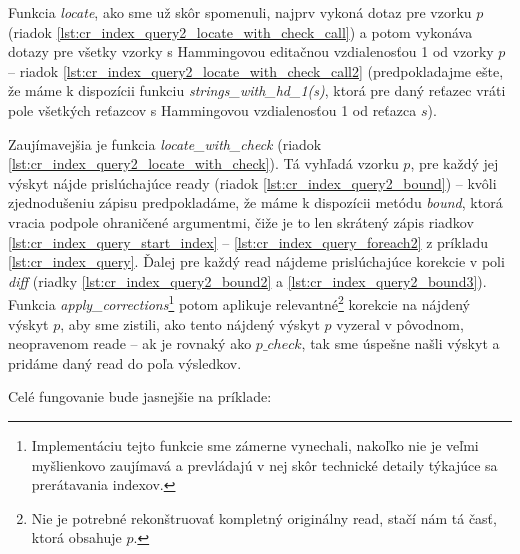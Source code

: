 Funkcia \emph{locate}, ako sme už skôr spomenuli, najprv vykoná dotaz pre vzorku $p$ (riadok \ref{lst:cr_index_query2_locate_with_check_call}) a potom vykonáva dotazy pre všetky vzorky s Hammingovou editačnou vzdialenosťou 1 od vzorky $p$ -- riadok \ref{lst:cr_index_query2_locate_with_check_call2} (predpokladajme ešte, že máme k dispozícii funkciu \emph{strings\_with\_hd\_1(s)}, ktorá pre daný reťazec vráti pole všetkých reťazcov s Hammingovou vzdialenosťou 1 od reťazca $s$).

Zaujímavejšia je funkcia \emph{locate\_with\_check} (riadok \ref{lst:cr_index_query2_locate_with_check}). Tá vyhľadá vzorku $p$, pre každý jej výskyt nájde prislúchajúce ready (riadok \ref{lst:cr_index_query2_bound}) -- kvôli zjednodušeniu zápisu predpokladáme, že máme k dispozícii metódu \emph{bound}, ktorá vracia podpole ohraničené argumentmi, čiže je to len skrátený zápis riadkov \ref{lst:cr_index_query_start_index} -- \ref{lst:cr_index_query_foreach2} z príkladu \ref{lst:cr_index_query}. Ďalej pre každý read nájdeme prislúchajúce korekcie v poli \emph{diff} (riadky \ref{lst:cr_index_query2_bound2} a \ref{lst:cr_index_query2_bound3}). Funkcia \emph{apply\_corrections}\footnote{Implementáciu tejto funkcie sme zámerne vynechali, nakoľko nie je veľmi myšlienkovo zaujímavá a prevládajú v nej skôr technické detaily týkajúce sa prerátavania indexov.} potom aplikuje relevantné\footnote{Nie je potrebné rekonštruovať kompletný originálny read, stačí nám tá časť, ktorá obsahuje $p$.} korekcie na nájdený výskyt $p$, aby sme zistili, ako tento nájdený výskyt $p$ vyzeral v pôvodnom, neopravenom reade -- ak je rovnaký ako $p\_check$, tak sme úspešne našli výskyt a pridáme daný read do poľa výsledkov.

Celé fungovanie bude jasnejšie na príklade:

